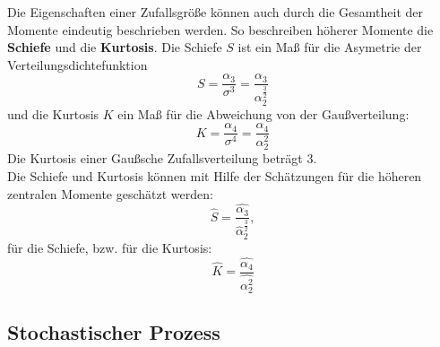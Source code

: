 Die Eigenschaften einer Zufallsgröße können auch durch die Gesamtheit der Momente eindeutig beschrieben werden. So beschreiben höherer Momente die \textbf{Schiefe} und die \textbf{Kurtosis}. Die Schiefe $S$ ist ein Maß für die Asymetrie der Verteilungsdichtefunktion
\[
S = \frac {\alpha_3}{\sigma^3}=\frac {\alpha_3}{\alpha_2^{\frac{3}{2}}}
\]
und die Kurtosis $K$ ein Maß für die Abweichung von der Gaußverteilung:
\[
K=\frac {\alpha_4}{\sigma^4}=\frac {\alpha_4}{\alpha_2^2}
\]
Die Kurtosis einer Gaußsche Zufallsverteilung beträgt 3.\\
Die Schiefe und Kurtosis können mit Hilfe der Schätzungen für die höheren zentralen Momente geschätzt werden:
\[
\hat S=\frac {\hat{\alpha_3}}{\hat{\alpha}_2^{\frac{3}{2}}},
\]
für die Schiefe, bzw. für die Kurtosis:
\[
\hat K=\frac {\hat{\alpha_4}}{\hat{\alpha_2^2}}
\]


\subsection{Stochastischer Prozess}

